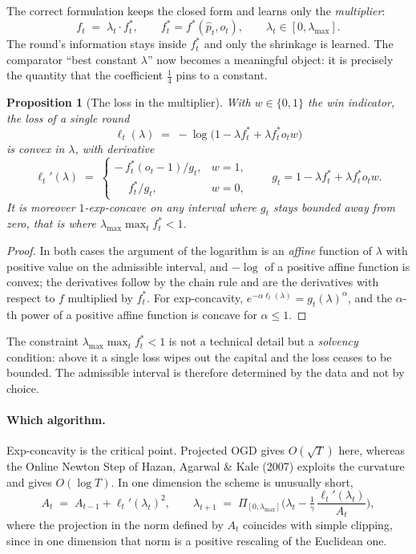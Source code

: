 \documentclass[12pt,a4paper,oneside]{report}
\renewcommand{\_}{\oldunderscore\allowbreak}
\theoremstyle{definition}
\theoremstyle{plain}
\newtheorem{proposition}[theorem]{Proposition}
\theoremstyle{remark}
\begin{document}
The correct formulation keeps the closed form and learns only the \emph{multiplier}:
\[
f_t \;=\; \lambda_t \cdot f^{*}_t, \qquad f^{*}_t = f^{*}(\hat{p}_t, o_t),
\qquad \lambda_t \in [0, \lambda_{\max}].
\]
The round's information stays inside $f^{*}_t$ and only the shrinkage is learned. The comparator
``best constant $\lambda$'' now becomes a meaningful object: it is precisely the quantity that
the coefficient $\tfrac14$ pins to a constant.

\begin{proposition}[The loss in the multiplier]
\label{prop:oco-kelly}
With $w \in \{0,1\}$ the win indicator, the loss of a single round
\[
\ell_t(\lambda) \;=\; -\log\big(1 - \lambda f^{*}_t + \lambda f^{*}_t o_t w\big)
\]
is convex in $\lambda$, with derivative
\[
\ell_t'(\lambda) \;=\;
\begin{cases}
-\,f^{*}_t (o_t-1) / g_t, & w=1,\\[2pt]
\phantom{-}f^{*}_t / g_t, & w=0,
\end{cases}
\qquad g_t = 1 - \lambda f^{*}_t + \lambda f^{*}_t o_t w .
\]
It is moreover $1$-exp-concave on any interval where $g_t$ stays bounded away from zero, that is
where $\lambda_{\max}\max_t f^{*}_t < 1$.
\end{proposition}

\begin{proof}
In both cases the argument of the logarithm is an \emph{affine} function of $\lambda$ with
positive value on the admissible interval, and $-\log$ of a positive affine function is convex;
the derivatives follow by the chain rule and are the derivatives with respect to $f$ multiplied
by $f^{*}_t$. For exp-concavity, $e^{-\alpha \ell_t(\lambda)} = g_t(\lambda)^{\alpha}$, and the
$\alpha$-th power of a positive affine function is concave for $\alpha \leq 1$.
\end{proof}

The constraint $\lambda_{\max}\max_t f^{*}_t < 1$ is not a technical detail but a
\emph{solvency} condition: above it a single loss wipes out the capital and the loss ceases to be
bounded. The admissible interval is therefore determined by the data and not by choice.

\paragraph{Which algorithm.} Exp-concavity is the critical point. Projected OGD gives $O(\sqrt{T})$
here, whereas the Online Newton Step of Hazan, Agarwal \& Kale (2007) exploits the curvature and
gives $O(\log T)$. In one dimension the scheme is unusually short,
\[
A_t \;=\; A_{t-1} + \ell_t'(\lambda_t)^2, \qquad
\lambda_{t+1} \;=\; \Pi_{[0,\lambda_{\max}]}\Big(\lambda_t - \tfrac{1}{\gamma}\,
\frac{\ell_t'(\lambda_t)}{A_t}\Big),
\]
where the projection in the norm defined by $A_t$ coincides with simple clipping, since in one
dimension that norm is a positive rescaling of the Euclidean one.
\end{document}
